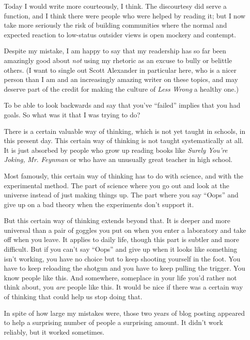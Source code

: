\documentclass[letterpaper]{book}
\begin{document}
{
 Today I would write more courteously, I think. The discourtesy did
serve a function, and I think there were people who were helped by
reading it; but I now take more seriously the risk of building
communities where the normal and expected reaction to low-status
outsider views is open mockery and contempt.}

{
 Despite my mistake, I am happy to say that my readership has so
far been amazingly good about \textit{not} using my rhetoric as an
excuse to bully or belittle others. (I want to single out Scott
Alexander in particular here, who is a nicer person than I am and an
increasingly amazing writer on these topics, and may deserve part of
the credit for making the culture of \textit{Less Wrong} a healthy
one.)}

{
 To be able to look backwards and say that you've
``failed'' implies that you had
goals. So what was it that I was trying to do?}

{
 There is a certain valuable way of thinking, which is not yet
taught in schools, in this present day. This certain way of thinking is
not taught systematically at all. It is just absorbed by people who
grow up reading books like \textit{Surely You're
Joking, Mr. Feynman} or who have an unusually great teacher in high
school.}

{
 Most famously, this certain way of thinking has to do with
science, and with the experimental method. The part of science where
you go out and look at the universe instead of just making things up.
The part where you say ``Oops'' and
give up on a bad theory when the experiments don't
support it.}

{
 But this certain way of thinking extends beyond that. It is deeper
and more universal than a pair of goggles you put on when you enter a
laboratory and take off when you leave. It applies to daily life,
though this part is subtler and more difficult. But if you
can't say ``Oops''
and give up when it looks like something isn't working,
you have no choice but to keep shooting yourself in the foot. You have
to keep reloading the shotgun and you have to keep pulling the trigger.
You know people like this. And somewhere, someplace in your life
you'd rather not think about, you \textit{are} people
like this. It would be nice if there was a certain way of thinking that
could help us stop doing that.}

{
 In spite of how large my mistakes were, those two years of blog
posting appeared to help a surprising number of people a surprising
amount. It didn't work reliably, but it worked
sometimes.}
\end{document}

